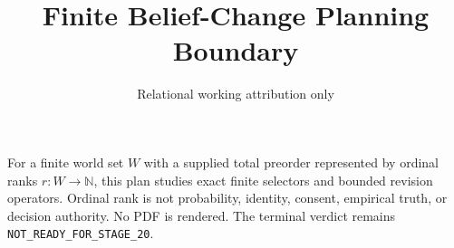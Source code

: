 \documentclass{article}
\title{Finite Belief-Change Planning Boundary}
\author{Relational working attribution only}
\begin{document}
\maketitle
For a finite world set $W$ with a supplied total preorder represented by ordinal ranks $r:W\to\mathbb{N}$, this plan studies exact finite selectors and bounded revision operators. Ordinal rank is not probability, identity, consent, empirical truth, or decision authority. No PDF is rendered. The terminal verdict remains \texttt{NOT\_READY\_FOR\_STAGE\_20}.
\end{document}

